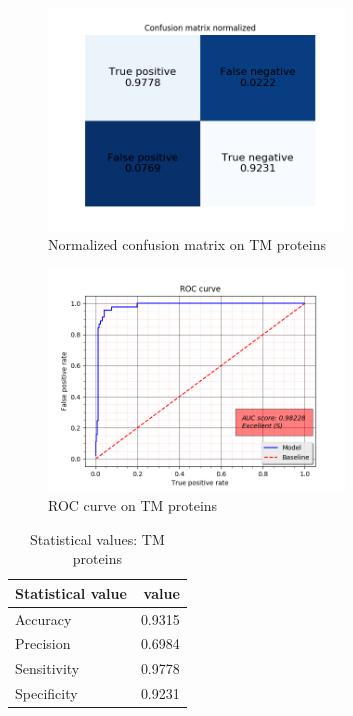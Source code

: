 \begin{figure}[H]
\center
\includegraphics[width=0.7\textwidth]{pictures/tm_cm_normalized.png}
\caption{\label{fig:tm_normalized_cm}Normalized confusion matrix on TM proteins}
\end{figure}

\begin{figure}[H]
\center
\includegraphics[width=0.7\textwidth]{pictures/tm_roc.png}
\caption{\label{fig:tm_roc}ROC curve on TM proteins}
\end{figure}

\begin{table}[H]
\centering
\begin{tabular}{l | r} %
Statistical value & value\\\hline
Accuracy & 0.9315 \\
Precision & 0.6984 \\
Sensitivity &  0.9778 \\
Specificity & 0.9231 \\
\end{tabular}
\caption{\label{tab:tm_stat_table}Statistical values: TM proteins}
\end{table}


